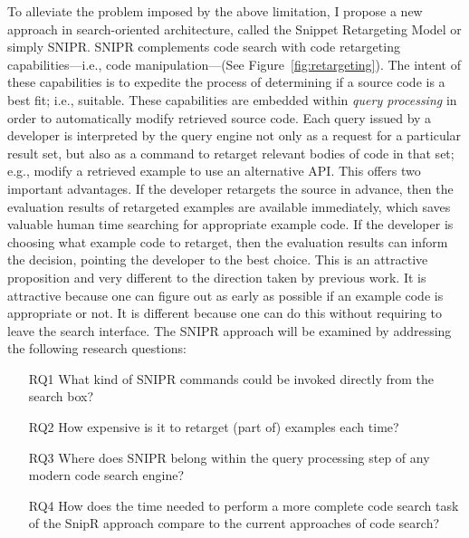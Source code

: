 \documentclass[conference]{IEEEtran}
\begin{document}
To alleviate the problem imposed by the above limitation, I propose a new approach in search-oriented architecture, called the Snippet Retargeting Model or simply \uppercase{SnipR}. \uppercase{SnipR} complements code search with code retargeting capabilities---i.e., code manipulation---(See Figure~\ref{fig:retargeting}). The intent of these capabilities is to expedite the process of determining if a source code is a best fit; i.e., suitable. These capabilities are embedded within \emph{query processing} in order to automatically modify retrieved source code. Each query issued by a developer is interpreted by the query engine not only as a request for a particular result set, but also as a command to retarget relevant bodies of code in that set; e.g., modify a retrieved example to use an alternative API. This offers two important advantages. If the developer retargets the source in advance, then the evaluation results of retargeted examples are available immediately, which saves valuable human time searching for appropriate example code. If the developer is choosing what example code to retarget, then the evaluation results can inform the decision, pointing the developer to the best choice. This is an attractive proposition and very different to the direction taken by previous work. It is attractive because one can figure out as early as possible if an example code is appropriate or not. It is different because one can do this without requiring to leave the search interface. The \uppercase{SnipR} approach will be examined by addressing the following research questions:

\begin{itemize}  
\item[RQ1] What kind of \uppercase{SnipR} commands could be invoked directly from the search box?
\item[RQ2] How expensive is it to retarget (part of) examples each time?
\item[RQ3] Where does \uppercase{SnipR} belong within the query processing step of any modern code search engine?
\item[RQ4] How does the time needed to perform a more complete code search task of the SnipR approach compare to the current approaches of code search? 
\end{itemize}
\end{document}

